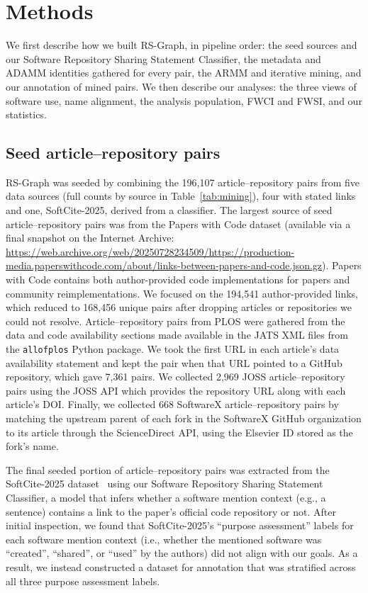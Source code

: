 \documentclass[pdflatex,sn-nature]{sn-jnl}%
\begin{document}
\section{Methods}\label{sec:methods}

We first describe how we built RS-Graph, in pipeline order: the seed sources and our Software Repository Sharing Statement Classifier, the metadata and ADAMM identities gathered for every pair, the ARMM and iterative mining, and our annotation of mined pairs. We then describe our analyses: the three views of software use, name alignment, the analysis population, FWCI and FWSI, and our statistics.

\subsection{Seed article--repository pairs}\label{subsec:m-seeds}

RS-Graph was seeded by combining the 196,107 article--repository pairs from five data sources (full counts by source in Table~\ref{tab:mining}), four with stated links and one, SoftCite-2025, derived from a classifier.
The largest source of seed article--repository pairs was from the Papers with Code dataset (available via a final snapshot on the Internet Archive: \url{https://web.archive.org/web/20250728234509/https://production-media.paperswithcode.com/about/links-between-papers-and-code.json.gz}).
Papers with Code contains both author-provided code implementations for papers and community reimplementations.
We focused on the 194,541 author-provided links, which reduced to 168,456 unique pairs after dropping articles or repositories we could not resolve.
Article--repository pairs from PLOS were gathered from the data and code availability sections made available in the JATS XML files from the \texttt{allofplos} Python package.
We took the first URL in each article's data availability statement and kept the pair when that URL pointed to a GitHub repository, which gave 7,361 pairs.
We collected 2,969 JOSS article--repository pairs using the JOSS API which provides the repository URL along with each article's DOI.
Finally, we collected 668 SoftwareX article--repository pairs by matching the upstream parent of each fork in the SoftwareX GitHub organization to its article through the ScienceDirect API, using the Elsevier ID stored as the fork's name.

The final seeded portion of article--repository pairs was extracted from the SoftCite-2025 dataset~\cite{howison_2025_15149379} using our Software Repository Sharing Statement Classifier, a model that infers whether a software mention context (e.g., a sentence) contains a link to the paper's official code repository or not.
After initial inspection, we found that SoftCite-2025's ``purpose assessment'' labels for each software mention context (i.e., whether the mentioned software was ``created'', ``shared'', or ``used'' by the authors) did not align with our goals.
As a result, we instead constructed a dataset for annotation that was stratified across all three purpose assessment labels.
\end{document}
